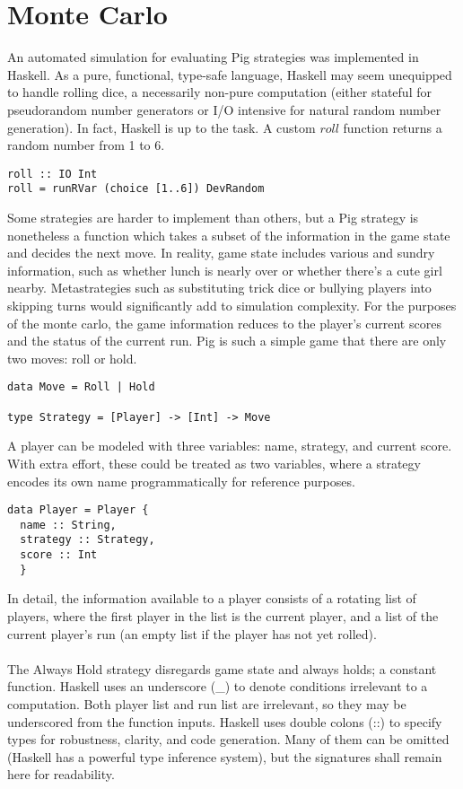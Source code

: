 \documentclass{article}
\begin{document}
\section*{Monte Carlo}
An automated simulation for evaluating Pig strategies was implemented in Haskell. As a pure, functional, type-safe language, Haskell may seem unequipped to handle rolling dice, a necessarily non-pure computation (either stateful for pseudorandom number generators or I/O intensive for natural random number generation). In fact, Haskell is up to the task. A custom $roll$ function returns a random number from 1 to 6.
\begin{verbatim}
roll :: IO Int
roll = runRVar (choice [1..6]) DevRandom
\end{verbatim}
Some strategies are harder to implement than others, but a Pig strategy is nonetheless a function which takes a subset of the information in the game state and decides the next move. In reality, game state includes various and sundry information, such as whether lunch is nearly over or whether there's a cute girl nearby. Metastrategies such as substituting trick dice or bullying players into skipping turns would significantly add to simulation complexity. For the purposes of the monte carlo, the game information reduces to the player's current scores and the status of the current run. Pig is such a simple game that there are only two moves: roll or hold.
\begin{verbatim}
data Move = Roll | Hold

type Strategy = [Player] -> [Int] -> Move
\end{verbatim}
A player can be modeled with three variables: name, strategy, and current score. With extra effort, these could be treated as two variables, where a strategy encodes its own name programmatically for reference purposes.
\begin{verbatim}
data Player = Player {
  name :: String,
  strategy :: Strategy,
  score :: Int
  }
\end{verbatim}
In detail, the information available to a player consists of a rotating list of players, where the first player in the list is the current player, and a list of the current player's run (an empty list if the player has not yet rolled).
\\\\
The Always Hold strategy disregards game state and always holds; a constant function. Haskell uses an underscore (\_) to denote conditions irrelevant to a computation. Both player list and run list are irrelevant, so they may be underscored from the function inputs. Haskell uses double colons (::) to specify types for robustness, clarity, and code generation. Many of them can be omitted (Haskell has a powerful type inference system), but the signatures shall remain here for readability.
\end{document}

